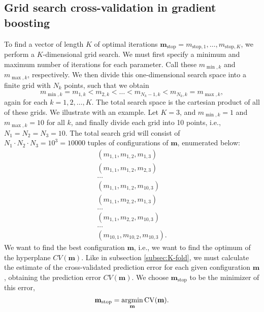 \subsection{Grid search cross-validation in gradient boosting}\label{grid-search}
To find a vector of length $K$ of optimal iterations $\mathbf{m}_{\text{stop}}=m_{\text{stop},1},\ldots,m_{\text{stop},K}$, we perform a $K$-dimensional grid search. We must first specify a minimum and maximum number of iterations for each parameter. Call these $m_{\min,k}$ and $m_{\max,k}$, respectively. We then divide this one-dimensional search space into a finite grid with $N_k$ points, such that we obtain
\begin{equation} 
    m_{\min,k}=m_{1,k}<m_{2,k}<\ldots<m_{N_k-1,k}<m_{N_k,k}=m_{\max,k},
\end{equation}
again for each $k=1,2,\ldots,K$. The total search space is the cartesian product of all of these grids. We illustrate with an example. Let $K=3$, and $m_{\min,k}=1$ and $m_{\max,k}=10$ for all $k$, and finally divide each grid into 10 points, i.e., $N_1=N_2=N_3=10$. The total search grid will consist of $N_1\cdot N_2\cdot N_3=10^3=10000$ tuples of configurations of $\mathbf{m}$, enumerated below:
\begin{align*}
    \left(m_{1,1},m_{1,2},m_{1,3}\right) \\
    \left(m_{1,1},m_{1,2},m_{2,3}\right) \\
    \ldots \\
    \left(m_{1,1},m_{1,2},m_{10,3}\right) \\
    \left(m_{1,1},m_{2,2},m_{1,3}\right) \\
    \ldots \\
    \left(m_{1,1},m_{2,2},m_{10,3}\right) \\
    \ldots \\
    \left(m_{10,1},m_{10,2},m_{10,3}\right).
\end{align*}
We want to find the best configuration $\mathbf{m}$, i.e., we want to find the optimum of the hyperplane $CV(\mathbf{m})$. Like in subsection \ref{subsec:K-fold}, we must calculate the estimate of the cross-validated prediction error for each given configuration $\mathbf{m}$, obtaining the prediction error $CV(\mathbf{m})$. We choose $\mathbf{m}_{\text{stop}}$ to be the minimizer of this error,
\begin{equation*}
    \mathbf{m}_{\text{stop}}=\operatorname*{argmin}_{\mathbf{m}}\operatorname{CV}(\mathbf{m}).
\end{equation*}
